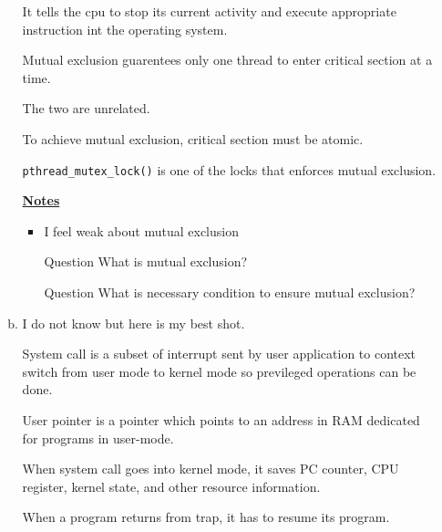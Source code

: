 \documentclass[12pt]{article}
\begin{document}
\begin{enumerate}[1.]
\begin{enumerate}[a)]
        It tells the cpu to stop its current activity and execute appropriate instruction
        int the operating system.

        \bigskip

        Mutual exclusion guarentees only one thread to enter critical section at a time.

        \bigskip

        The two are unrelated.

        \bigskip

        To achieve mutual exclusion, critical section must be atomic.

        \bigskip

        \texttt{pthread\_mutex\_lock()} is one of the locks that enforces mutual exclusion.

        \bigskip

        \underline{\textbf{Notes}}

        \begin{itemize}
            \item I feel weak about mutual exclusion
            \item [\color{blue}Question\color{black}] What is mutual exclusion?
            \item [\color{blue}Question\color{black}] What is necessary condition to ensure mutual exclusion?
        \end{itemize}

        \item

        I do not know but here is my best shot.

        \bigskip

        System call is a subset of interrupt sent by user application to context switch
        from user mode to kernel mode so previleged operations can be done.

        \bigskip

        User pointer is a pointer which points to an address in RAM dedicated for
        programs in user-mode.

        \bigskip

        When system call goes into kernel mode, it saves PC counter, CPU register, kernel state,
        and other resource information.

        \bigskip

        When a program returns from trap, it has to resume its program.

        \bigskip


\end{enumerate}
\end{enumerate}
\end{document}
